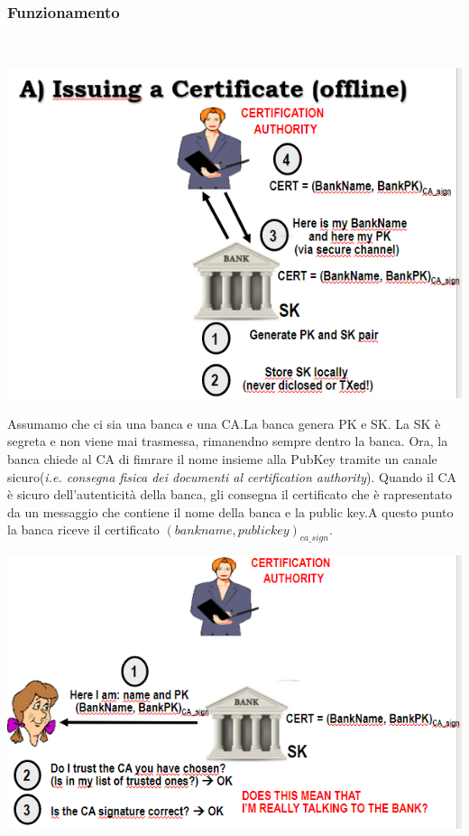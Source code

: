 \documentclass{book}
\theoremstyle{remark}
\begin{document}
\subsubsection{Funzionamento}\mbox{}\\
\begin{center}
	\includegraphics[scale=0.4]{2021-12-06-10-26-26.png}
\end{center}
Assumamo che ci sia una banca e una CA\@.La banca genera PK e SK\@. La SK è segreta e non viene mai trasmessa, rimanendno sempre dentro la banca\@. Ora, la banca chiede al CA di fimrare il nome insieme alla PubKey tramite un canale sicuro(\emph{i\@.e\@. consegna fisica dei documenti al certification authority})\@. Quando il CA è sicuro dell'autenticità della banca, gli consegna il certificato che è rapresentato da un messaggio che contiene il nome della banca e la public key\@.\newline A questo punto la banca riceve il certificato \emph{\((bankname,publickey)_{ca\_sign}\)}\@.
\begin{center}
	\includegraphics[scale=0.5]{2021-12-06-10-31-01.png}
\end{center}
\end{document}
